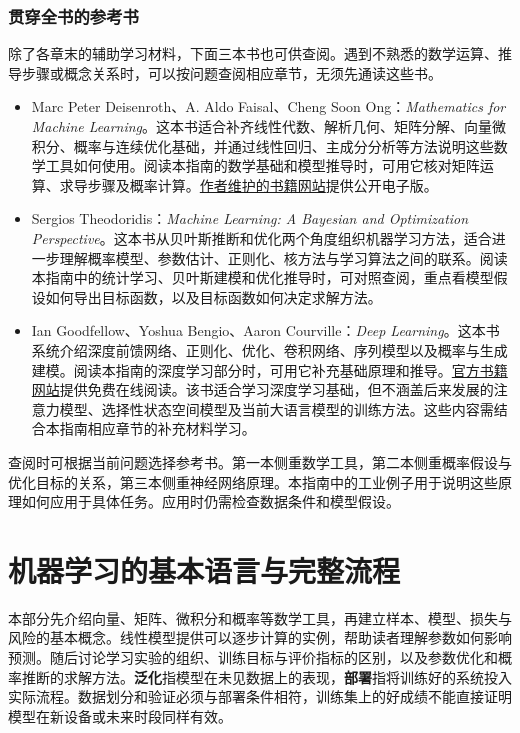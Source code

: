 \documentclass[UTF8,11pt,zihao=false,linespread=1.3,openany]{ctexbook}
\begin{document}
\section*{贯穿全书的参考书}
除了各章末的辅助学习材料，下面三本书也可供查阅。遇到不熟悉的数学运算、推导步骤或概念关系时，可以按问题查阅相应章节，无须先通读这些书。
\begin{itemize}
 \item Marc Peter Deisenroth、A. Aldo Faisal、Cheng Soon Ong：\textit{Mathematics for Machine Learning}。这本书适合补齐线性代数、解析几何、矩阵分解、向量微积分、概率与连续优化基础，并通过线性回归、主成分分析等方法说明这些数学工具如何使用。阅读本指南的数学基础和模型推导时，可用它核对矩阵运算、求导步骤及概率计算。\href{https://mml-book.com}{作者维护的书籍网站}提供公开电子版。
 \item Sergios Theodoridis：\textit{Machine Learning: A Bayesian and Optimization Perspective}。这本书从贝叶斯推断和优化两个角度组织机器学习方法，适合进一步理解概率模型、参数估计、正则化、核方法与学习算法之间的联系。阅读本指南中的统计学习、贝叶斯建模和优化推导时，可对照查阅，重点看模型假设如何导出目标函数，以及目标函数如何决定求解方法。
 \item Ian Goodfellow、Yoshua Bengio、Aaron Courville：\textit{Deep Learning}。这本书系统介绍深度前馈网络、正则化、优化、卷积网络、序列模型以及概率与生成建模。阅读本指南的深度学习部分时，可用它补充基础原理和推导。\href{https://www.deeplearningbook.org/}{官方书籍网站}提供免费在线阅读。该书适合学习深度学习基础，但不涵盖后来发展的注意力模型、选择性状态空间模型及当前大语言模型的训练方法。这些内容需结合本指南相应章节的补充材料学习。
\end{itemize}
查阅时可根据当前问题选择参考书。第一本侧重数学工具，第二本侧重概率假设与优化目标的关系，第三本侧重神经网络原理。本指南中的工业例子用于说明这些原理如何应用于具体任务。应用时仍需检查数据条件和模型假设。

\mainmatter
\part{机器学习的基本语言与完整流程}
本部分先介绍向量、矩阵、微积分和概率等数学工具，再建立样本、模型、损失与风险的基本概念。线性模型提供可以逐步计算的实例，帮助读者理解参数如何影响预测。随后讨论学习实验的组织、训练目标与评价指标的区别，以及参数优化和概率推断的求解方法。\textbf{泛化}指模型在未见数据上的表现，\textbf{部署}指将训练好的系统投入实际流程。数据划分和验证必须与部署条件相符，训练集上的好成绩不能直接证明模型在新设备或未来时段同样有效。





\end{document}
